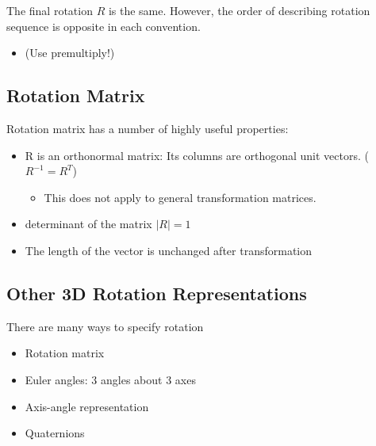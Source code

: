 \documentclass[10pt]{article}
\begin{document}
The final rotation $R$ is the same.  However, the order of describing rotation sequence is opposite in each convention.
\begin{itemize}
	\item (Use premultiply!)
\end{itemize}

\subsection*{Rotation Matrix}
Rotation matrix has a number of highly useful properties:
\begin{itemize}
	\item R is an orthonormal matrix: Its columns are orthogonal unit vectors. ($R^{-1} = R^T$)
	\begin{itemize}
        \item This does not apply to general transformation matrices.
    \end{itemize}
	\item determinant of the matrix $|R| = 1$
	\item The length of the vector is unchanged after transformation
\end{itemize}

\subsection*{Other 3D Rotation Representations}
There are many ways to specify rotation
\begin{itemize}
	\item Rotation matrix
	\item Euler angles: 3 angles about 3 axes
	\item Axis-angle representation
	\item Quaternions
\end{itemize}
\end{document}
